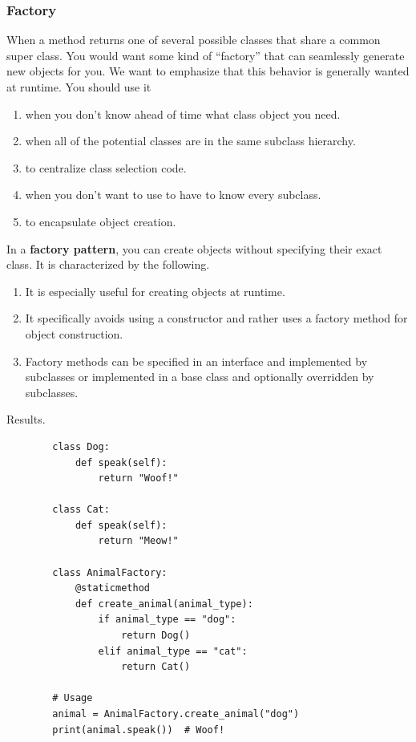 
  \subsubsection{Factory} 

    When a method returns one of several possible classes that share a common super class. You would want some kind of ``factory'' that can seamlessly generate new objects for you. We want to emphasize that this behavior is generally wanted at runtime. You should use it 
    \begin{enumerate}
      \item when you don't know ahead of time what class object you need. 
      \item when all of the potential classes are in the same subclass hierarchy. 
      \item to centralize class selection code. 
      \item when you don't want to use to have to know every subclass. 
      \item to encapsulate object creation. 
    \end{enumerate}

    \begin{definition}
      \label{def:factory-pattern}
      In a \textbf{factory pattern}, you can create objects without specifying their exact class. It is characterized by the following. 
      \begin{enumerate}
        \item It is especially useful for creating objects at runtime. 
        \item It specifically avoids using a constructor and rather uses a factory method for object construction. 
        \item Factory methods can be specified in an interface and implemented by subclasses or implemented in a base class and optionally overridden by subclasses.
      \end{enumerate}
    \end{definition}

    Results. 

    \begin{example}
      \label{ex:animal-factory}
      \begin{lstlisting}
        class Dog:
            def speak(self):
                return "Woof!"

        class Cat:
            def speak(self):
                return "Meow!"

        class AnimalFactory:
            @staticmethod
            def create_animal(animal_type):
                if animal_type == "dog":
                    return Dog()
                elif animal_type == "cat":
                    return Cat()

        # Usage
        animal = AnimalFactory.create_animal("dog")
        print(animal.speak())  # Woof! 
      \end{lstlisting}
    \end{example}

